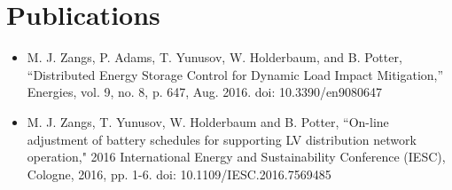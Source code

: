 \section{Publications}
\label{ch-introduction:sec:publications}

\begin{itemize}
	\item M. J. Zangs, P. Adams, T. Yunusov, W. Holderbaum, and B. Potter, ``Distributed Energy Storage Control for Dynamic Load Impact Mitigation,'' Energies, vol. 9, no. 8, p. 647, Aug. 2016. doi: 10.3390/en9080647
	\item M. J. Zangs, T. Yunusov, W. Holderbaum and B. Potter, ``On-line adjustment of battery schedules for supporting LV distribution network operation," 2016 International Energy and Sustainability Conference (IESC), Cologne, 2016, pp. 1-6. doi: 10.1109/IESC.2016.7569485
\end{itemize}